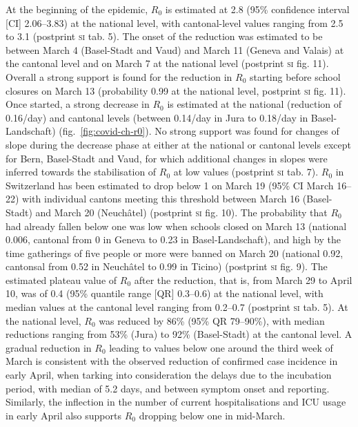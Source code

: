 At the beginning of the epidemic, $R_0$ is estimated at 2.8 (95\% confidence interval [CI] 2.06–3.83) at the national level, with cantonal-level values ranging from 2.5 to 3.1 (postprint \textsc{si} tab. 5). The onset of the reduction was estimated to be between March 4 (Basel-Stadt and Vaud) and March 11 (Geneva and Valais) at the cantonal level and on March 7 at the national level (postprint \textsc{si} fig. 11). Overall a strong support is found for the reduction in $R_0$ starting before school closures on March 13 (probability 0.99 at the national level, postprint \textsc{si} fig. 11). Once started, a strong decrease in $R_0$ is estimated at the national (reduction of 0.16/day) and cantonal levels (between 0.14/day in Jura to 0.18/day in Basel-Landschaft) (fig.~\ref{fig:covid-ch-r0}). No strong support was found for changes of slope during the decrease phase at either at the national or cantonal levels except for Bern, Basel-Stadt and Vaud, for which additional changes in slopes were inferred towards the stabilisation of $R_0$ at low values (postprint \textsc{si} tab. 7). $R_0$ in Switzerland has been estimated to drop below 1 on March 19 (95\% CI March 16–22) with individual cantons meeting this threshold between March 16 (Basel-Stadt) and March 20 (Neuchâtel) (postprint \textsc{si} fig. 10). The probability that $R_0$ had already fallen below one was low when schools closed on March 13 (national 0.006, cantonal from $0$ in Geneva to 0.23 in Basel-Landschaft), and high by the time gatherings of five people or more were banned on March 20 (national 0.92, cantonsal from 0.52 in Neuchâtel to 0.99 in Ticino) (postprint \textsc{si} fig. 9). The estimated plateau value of $R_0$ after the reduction, that is, from March 29 to April 10, was of 0.4 (95\% quantile range [QR] 0.3–0.6) at the national level, with median values at the cantonal level ranging from 0.2–0.7 (postprint \textsc{si} tab. 5). At the national level, $R_0$ was reduced by 86\% (95\% QR 79–90\%), with median reductions ranging from 53\% (Jura) to 92\% (Basel-Stadt) at the cantonal level. A gradual reduction in $R_0$ leading to values below one around the third week of March is consistent with the observed reduction of confirmed case incidence in early April, when tarking into consideration the delays due to the incubation period, with median of 5.2 days\cite[-6\baselineskip]{Lauer:IncubationPeriodCoronavirus:2020}, and between symptom onset and reporting\cite[-2\baselineskip]{Bi:EpidemiologyTransmissionCOVID19:2020}. Similarly, the inflection in the number of current hospitalisations and ICU usage in early April also supports $R_0$ dropping below one in mid-March. 

